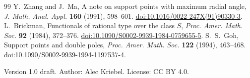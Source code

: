 \documentclass[10pt]{article}
\begin{document}
\begin{thebibliography}{99}
Y.~Zhang and J.~Ma, A note on support points with maximum radial angle,
\emph{J. Math. Anal. Appl.} \textbf{160} (1991), 598--601.
\href{https://doi.org/10.1016/0022-247X(91)90330-3}{doi:10.1016/0022-247X(91)90330-3}.
L.~Brickman, Functionals of rational type over the class \(S\),
\emph{Proc. Amer. Math. Soc.} \textbf{92} (1984), 372--376.
\href{https://doi.org/10.1090/S0002-9939-1984-0759655-5}{doi:10.1090/S0002-9939-1984-0759655-5}.
S.~S.~Goh, Support points and double poles,
\emph{Proc. Amer. Math. Soc.} \textbf{122} (1994), 463--468.
\href{https://doi.org/10.1090/S0002-9939-1994-1197537-4}{doi:10.1090/S0002-9939-1994-1197537-4}.
\end{thebibliography}
\smallskip\noindent\small
Version 1.0 draft. Author: Alec Kriebel. License: CC BY 4.0.
\end{document}
